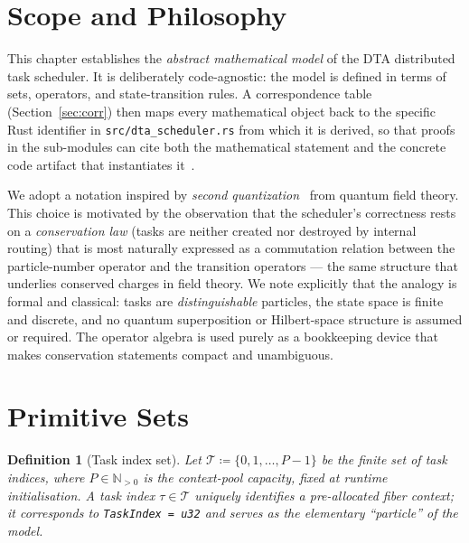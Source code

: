 \documentclass[11pt,a4paper]{report}
\newtheorem{definition}{Definition}[section]
\newcommand{\code}[1]{\texttt{#1}}
\begin{document}
\section{Scope and Philosophy}

This chapter establishes the \emph{abstract mathematical model} of
the DTA distributed task scheduler.  It is deliberately
code-agnostic: the model is defined in terms of sets, operators, and
state-transition rules.  A correspondence table (Section~\ref{sec:corr})
then maps every mathematical object back to the specific Rust
identifier in \code{src/dta\_scheduler.rs} from which it is derived,
so that proofs in the sub-modules can cite both the mathematical
statement and the concrete code artifact that instantiates it~\cite{dtact}.

We adopt a notation inspired by \emph{second quantization}~\cite{dirac1927,jordan_wigner1928,fock1932,landau_qm,landau_fields,landau_statphys,feynman_ii,feynman_iii,derrida2007,schutz2001} from
quantum field theory.  This choice is motivated by the observation
that the scheduler's correctness rests on a \emph{conservation law}
(tasks are neither created nor destroyed by internal routing) that is
most naturally expressed as a commutation relation between the
particle-number operator and the transition operators --- the same
structure that underlies conserved charges in field theory.  We note
explicitly that the analogy is formal and classical: tasks are
\emph{distinguishable} particles, the state space is finite and
discrete, and no quantum superposition or Hilbert-space structure is
assumed or required.  The operator algebra is used purely as a
bookkeeping device that makes conservation statements compact and
unambiguous.

\section{Primitive Sets}

\begin{definition}[Task index set]
\label{def:taskset}
Let $\mathcal{T} \coloneqq \{0, 1, \ldots, P-1\}$ be the finite set
of \emph{task indices}, where $P \in \mathbb{N}_{>0}$ is the
context-pool capacity, fixed at runtime initialisation.  A task index
$\tau \in \mathcal{T}$ uniquely identifies a pre-allocated fiber
context; it corresponds to \code{TaskIndex = u32} and serves as the
elementary ``particle'' of the model.
\end{definition}
\end{document}
